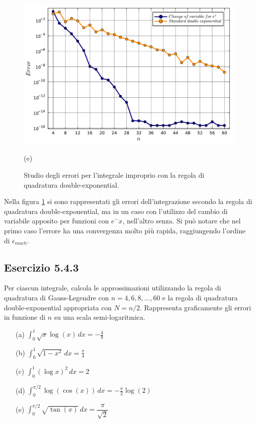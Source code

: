 \documentclass[letterpaper, 12pt]{article}
\begin{document}
\begin{figure}[!ht]
    \centering
    \begin{minipage}[b]{0.47\textwidth}
        \includegraphics[width=\textwidth]{5425.pdf}
        \caption*{(e)}
    \end{minipage}
    \caption{Studio degli errori per l'integrale improprio con la regola di quadratura double-exponential.}
    \label{fig:es5_4_2_2}
\end{figure}

Nella figura \ref{fig:es5_4_2_2} si sono rappresentati gli errori dell'integrazione secondo la regola di quadratura
double-exponential, ma in un caso con l'utilizzo del cambio di variabile apposito per funzioni con $e^-x$, 
nell'altro senza. Si può notare che nel primo caso l'errore ha una convergenza molto più rapida, raggiungendo 
l'ordine di $\epsilon_{mach}$.

\subsection{Esercizio 5.4.3}
Per ciascun integrale, calcola le approssimazioni utilizzando la regola di quadratura di Gauss-Legendre 
con $n=4,6,8,\ldots,60$ e la regola di quadratura double-exponential appropriata con $N=n/2$. 
Rappresenta graficamente gli errori in funzione di $n$ su una scala semi-logaritmica.

\begin{itemize}
    \item[(a)] $\displaystyle \int_0^1 \sqrt{x} \log(x) \, dx = -\frac{4}{9}$
    \item[(b)] $\displaystyle \int_0^1 \sqrt{1-x^2}\, dx = \frac{\pi}{4}$
    \item[(c)] $\displaystyle \int_0^1 (\log x)^2\, dx = 2$
    \item[(d)] $\displaystyle \int_0^{\pi/2} \log(\cos(x))\, dx = -\frac{\pi}{2}\log(2)$
    \item[(e)] $\displaystyle \int_0^{\pi/2} \sqrt{\tan(x)}\, dx = \dfrac{\pi}{\sqrt{2}}$
\end{itemize}
\end{document}
